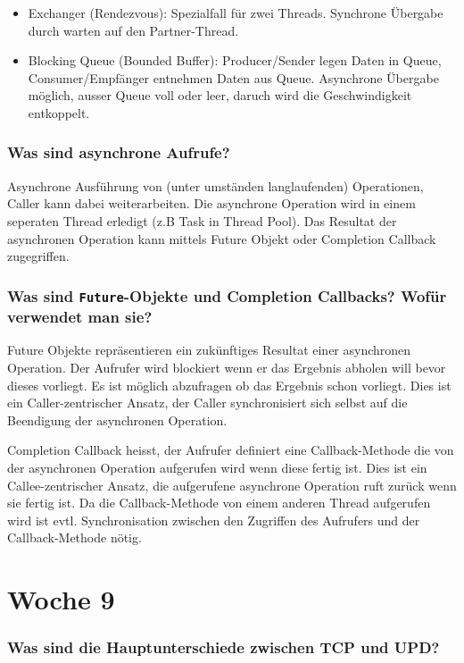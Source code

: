 \documentclass[10pt,a4paper]{scrartcl}
\begin{document}
\begin{itemize}
	\item Exchanger (Rendezvous): Spezialfall für zwei Threads. Synchrone Übergabe durch warten auf
		den Partner-Thread.
	\item Blocking Queue (Bounded Buffer): Producer/Sender legen Daten in Queue, Consumer/Empfänger
		entnehmen Daten aus Queue. Asynchrone Übergabe möglich, ausser Queue voll oder leer, daruch wird
		die Geschwindigkeit entkoppelt.
\end{itemize}
  
\subsubsection{Was sind asynchrone Aufrufe?}

Asynchrone Ausführung von (unter umständen langlaufenden) Operationen, Caller kann dabei
weiterarbeiten. Die asynchrone Operation wird in einem seperaten Thread erledigt (z.B Task in
Thread Pool). Das Resultat der asynchronen Operation kann mittels Future Objekt oder Completion
Callback zugegriffen.
  
\subsubsection{Was sind \texttt{Future}-Objekte und Completion Callbacks? Wofür verwendet man sie?}

Future Objekte repräsentieren ein zukünftiges Resultat einer asynchronen Operation. Der Aufrufer
wird blockiert wenn er das Ergebnis abholen will bevor dieses vorliegt. Es ist möglich abzufragen
ob das Ergebnis schon vorliegt. Dies ist ein Caller-zentrischer Ansatz, der Caller synchronisiert
sich selbst auf die Beendigung der asynchronen Operation.

Completion Callback heisst, der Aufrufer definiert eine Callback-Methode die von der asynchronen
Operation aufgerufen wird wenn diese fertig ist. Dies ist ein Callee-zentrischer Ansatz, die
aufgerufene asynchrone Operation ruft zurück wenn sie fertig ist. Da die Callback-Methode von einem
anderen Thread aufgerufen wird ist evtl. Synchronisation zwischen den Zugriffen des Aufrufers und
der Callback-Methode nötig.
  

\section{Woche 9}
 
\subsubsection{Was sind die Hauptunterschiede zwischen TCP und UPD?}
\end{document}
